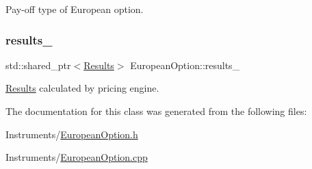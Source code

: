 Pay-\/off type of European option. 

\hypertarget{class_european_option_a228f13a5ce4c46caef1e3052b4a27610}{}\label{class_european_option_a228f13a5ce4c46caef1e3052b4a27610} 
\subsubsection{\texorpdfstring{results\+\_\+}{results\_}}
{\footnotesize\ttfamily std\+::shared\+\_\+ptr$<$\hyperlink{class_european_option_1_1_results}{Results}$>$ European\+Option\+::results\+\_\+\hspace{0.3cm}{\ttfamily [private]}}



\hyperlink{class_european_option_1_1_results}{Results} calculated by pricing engine. 



The documentation for this class was generated from the following files\+:\begin{DoxyCompactItemize}
\item 
Instruments/\hyperlink{_european_option_8h}{European\+Option.\+h}\item 
Instruments/\hyperlink{_european_option_8cpp}{European\+Option.\+cpp}\end{DoxyCompactItemize}
